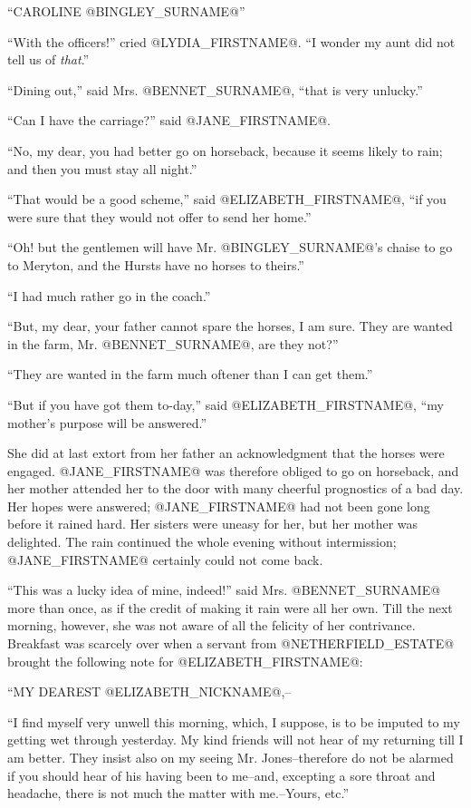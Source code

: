 ``CAROLINE @BINGLEY_SURNAME@''

``With the officers!'' cried @LYDIA_FIRSTNAME@. ``I wonder my aunt did not tell us of
\textit{that}.''

``Dining out,'' said Mrs. @BENNET_SURNAME@, ``that is very unlucky.''

``Can I have the carriage?'' said @JANE_FIRSTNAME@.

``No, my dear, you had better go on horseback, because it seems likely to
rain; and then you must stay all night.''

``That would be a good scheme,'' said @ELIZABETH_FIRSTNAME@, ``if you were sure that
they would not offer to send her home.''

``Oh! but the gentlemen will have Mr. @BINGLEY_SURNAME@'s chaise to go to Meryton,
and the Hursts have no horses to theirs.''

``I had much rather go in the coach.''

``But, my dear, your father cannot spare the horses, I am sure. They are
wanted in the farm, Mr. @BENNET_SURNAME@, are they not?''

``They are wanted in the farm much oftener than I can get them.''

``But if you have got them to-day,'' said @ELIZABETH_FIRSTNAME@, ``my mother's purpose
will be answered.''

She did at last extort from her father an acknowledgment that the horses
were engaged. @JANE_FIRSTNAME@ was therefore obliged to go on horseback, and her
mother attended her to the door with many cheerful prognostics of a
bad day. Her hopes were answered; @JANE_FIRSTNAME@ had not been gone long before
it rained hard. Her sisters were uneasy for her, but her mother was
delighted. The rain continued the whole evening without intermission;
@JANE_FIRSTNAME@ certainly could not come back.

``This was a lucky idea of mine, indeed!'' said Mrs. @BENNET_SURNAME@ more than
once, as if the credit of making it rain were all her own. Till the
next morning, however, she was not aware of all the felicity of her
contrivance. Breakfast was scarcely over when a servant from @NETHERFIELD_ESTATE@
brought the following note for @ELIZABETH_FIRSTNAME@:

``MY DEAREST @ELIZABETH_NICKNAME@,--

``I find myself very unwell this morning, which, I suppose, is to be
imputed to my getting wet through yesterday. My kind friends will not
hear of my returning till I am better. They insist also on my seeing Mr.
Jones--therefore do not be alarmed if you should hear of his having been
to me--and, excepting a sore throat and headache, there is not much the
matter with me.--Yours, etc.''

